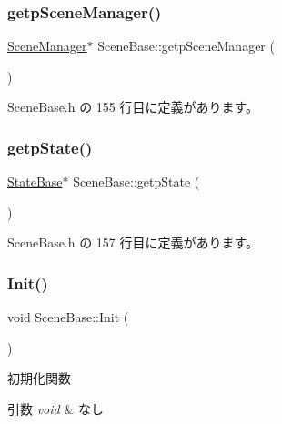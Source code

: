 \subsubsection{\texorpdfstring{getp\+Scene\+Manager()}{getpSceneManager()}}
{\footnotesize\ttfamily \mbox{\hyperlink{class_scene_manager}{Scene\+Manager}}$\ast$ Scene\+Base\+::getp\+Scene\+Manager (\begin{DoxyParamCaption}{ }\end{DoxyParamCaption})\hspace{0.3cm}{\ttfamily [inline]}}



 Scene\+Base.\+h の 155 行目に定義があります。

\mbox{\label{class_scene_base_a9ee8fb94a520c570663ea7ab223e7218}} 
\subsubsection{\texorpdfstring{getp\+State()}{getpState()}}
{\footnotesize\ttfamily \mbox{\hyperlink{class_scene_base_1_1_state_base}{State\+Base}}$\ast$ Scene\+Base\+::getp\+State (\begin{DoxyParamCaption}{ }\end{DoxyParamCaption})\hspace{0.3cm}{\ttfamily [inline]}}



 Scene\+Base.\+h の 157 行目に定義があります。

\mbox{\label{class_scene_base_a494ba624fdd95b296e4487ed1a34f47b}} 
\subsubsection{\texorpdfstring{Init()}{Init()}}
{\footnotesize\ttfamily void Scene\+Base\+::\+Init (\begin{DoxyParamCaption}{ }\end{DoxyParamCaption})}



初期化関数 


\begin{DoxyParams}{引数}
{\em void} & なし \\
\hline
\end{DoxyParams}

